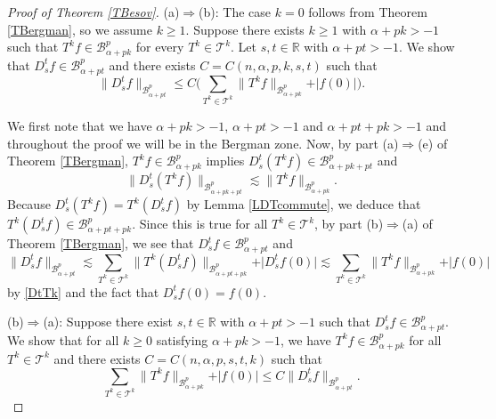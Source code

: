\documentclass{amsart}
\theoremstyle{definition}
\theoremstyle{remark}
\begin{document}
\begin{proof}[Proof of Theorem \ref{TBesov}]
(a)$\Rightarrow$(b):
The case $k=0$ follows from Theorem \ref{TBergman}, so we assume $k\ge 1$.
Suppose there exists $k\ge 1$ with $\alpha+pk>-1$ such that
$T^k f\in\mathcal B^p_{\alpha+pk}$ for every $T^k\in\mathcal T^k$.
Let $s,t\in\mathbb R$ with $\alpha+pt>-1$.
We show that $D^t_s f\in\mathcal B^p_{\alpha+pt}$ and there exists
$C=C(n,\alpha,p,k,s,t)$ such that
\begin{equation*}
\|D^t_s f\|_{\mathcal B^p_{\alpha+pt}}
\le C \bigl(\sum_{T^k\in\mathcal T^k}\|T^k f\|_{\mathcal B^p_{\alpha+pk}}
+\vert f(0)\vert\bigr).
\end{equation*}

We first note that we have $\alpha+pk>-1$, $\alpha+pt>-1$ and $\alpha+pt+pk>-1$
and throughout the proof we will be in the Bergman zone.
Now, by part (a)$\Rightarrow$(e) of Theorem \ref{TBergman},
$T^k f\in\mathcal B^p_{\alpha+pk}$ implies
$D^t_s(T^k f)\in\mathcal B^p_{\alpha+pk+pt}$ and
\begin{equation}\label{DtTk}
\|D^t_s(T^k f)\|_{\mathcal B^p_{\alpha+pk+pt}}
\lesssim \|T^k f\|_{\mathcal B^p_{\alpha+pk}}.
\end{equation}
Because $D^t_s(T^kf)=T^k(D^t_s f)$ by Lemma \ref{LDTcommute},
we deduce that $T^k(D^t_s f)\in\mathcal B^p_{\alpha+pt+pk}$.
Since this is true for all $T^k\in\mathcal T^k$, by part
(b)$\Rightarrow$(a) of Theorem \ref{TBergman}, we see that
$D^t_s f\in\mathcal B^p_{\alpha+pt}$ and
\begin{equation*}
\|D^t_s f\|_{\mathcal B^p_{\alpha+pt}}
\lesssim \sum_{T^k\in\mathcal T^k}\|T^k (D^t_s f)\|_{\mathcal B^p_{\alpha+pt+pk}}
+\vert D^t_s f(0)\vert
\lesssim \sum_{T^k\in\mathcal T^k}\|T^k f\|_{\mathcal B^p_{\alpha+pk}}
+\vert f(0)\vert
\end{equation*}
by \eqref{DtTk} and the fact that $D^t_s f(0)=f(0)$.

(b)$\Rightarrow$(a):
Suppose there exist $s,t\in\mathbb R$ with $\alpha+pt>-1$
such that $D^t_s f\in\mathcal B^p_{\alpha+pt}$.
We show that for all $k\ge 0$ satisfying $\alpha+pk>-1$,
we have $T^k f\in\mathcal B^p_{\alpha+pk}$ for all $T^k\in\mathcal T^k$
and there exists $C=C(n,\alpha,p,s,t,k)$ such that
\begin{equation*}
\sum_{T^k\in\mathcal T^k}\|T^k f\|_{\mathcal B^p_{\alpha+pk}}
+\vert f(0)\vert
\le C \|D^t_s f\|_{\mathcal B^p_{\alpha+pt}}.
\end{equation*}


\end{proof}
\end{document}
